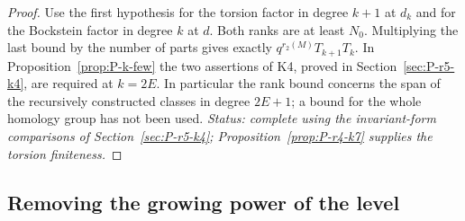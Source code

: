 \begin{proof}
Use the first hypothesis for the torsion factor in degree $k+1$ at $d_k$
and for the Bockstein factor in degree $k$ at $d$. Both ranks are at
least $N_0$. Multiplying the last bound by the number of parts gives
exactly $q^{r_2(M)}T_{k+1}T_k$. In Proposition~\ref{prop:P-k-few} the
two assertions of K4, proved in Section~\ref{sec:P-r5-k4}, are required at $k=2E$. In particular the
rank bound concerns the span of the recursively constructed classes in
degree $2E+1$; a bound for the whole homology group has not been used.
\emph{Status: complete using the invariant-form comparisons of Section~\ref{sec:P-r5-k4}; Proposition~\ref{prop:P-r4-k7} supplies the torsion finiteness.}
\end{proof}

\subsection{Removing the growing power of the level}

